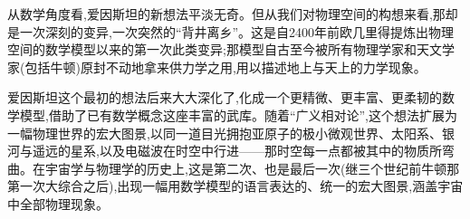  从数学角度看,爱因斯坦的新想法平淡无奇。但从我们对物理空间的构想来看,那却是一次深刻的变异,一次突然的“背井离乡”。这是自2400年前欧几里得提炼出物理空间的数学模型以来的第一次此类变异;那模型自古至今被所有物理学家和天文学家(包括牛顿)原封不动地拿来供力学之用,用以描述地上与天上的力学现象。

爱因斯坦这个最初的想法后来大大深化了,化成一个更精微、更丰富、更柔韧的数学模型,借助了已有数学概念这座丰富的武库。随着“广义相对论”,这个想法扩展为一幅物理世界的宏大图景,以同一道目光拥抱亚原子的极小微观世界、太阳系、银河与遥远的星系,以及电磁波在时空中行进——那时空每一点都被其中的物质所弯曲。在宇宙学与物理学的历史上,这是第二次、也是最后一次(继三个世纪前牛顿那第一次大综合之后),出现一幅用数学模型的语言表达的、统一的宏大图景,涵盖宇宙中全部物理现象。

